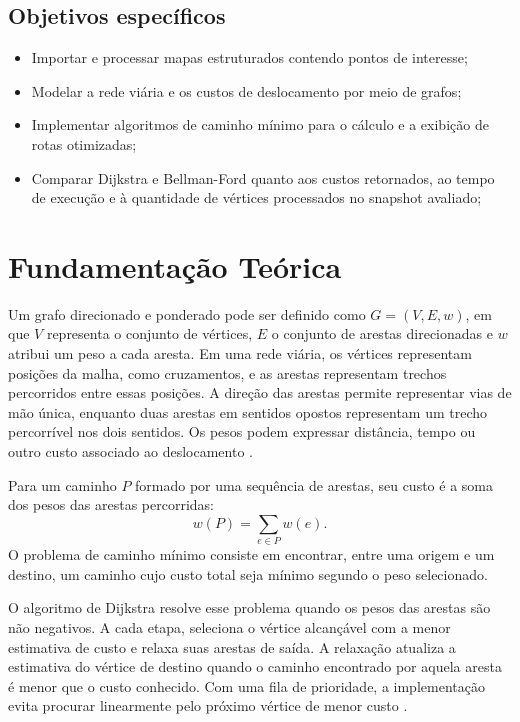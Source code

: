 \documentclass[12pt]{article}
\begin{document}
\subsection{Objetivos específicos}
\begin{itemize}
    \item Importar e processar mapas estruturados contendo pontos de interesse;
    \item Modelar a rede viária e os custos de deslocamento por meio de grafos;
    \item Implementar algoritmos de caminho mínimo para o cálculo e a exibição de rotas otimizadas;
    \item Comparar Dijkstra e Bellman-Ford quanto aos custos retornados, ao tempo de execução e à quantidade de vértices processados no snapshot avaliado;
\end{itemize}

\section{Fundamentação Teórica}
\label{sec:fundamentacao}

Um grafo direcionado e ponderado pode ser definido como
$G=(V,E,w)$, em que $V$ representa o conjunto de vértices, $E$ o
conjunto de arestas direcionadas e $w$ atribui um peso a cada aresta.
Em uma rede viária, os vértices representam posições da malha, como
cruzamentos, e as arestas representam trechos percorridos entre essas
posições. A direção das arestas permite representar vias de mão única,
enquanto duas arestas em sentidos opostos representam um trecho
percorrível nos dois sentidos. Os pesos podem expressar distância,
tempo ou outro custo associado ao deslocamento \cite{cormen2009}.

Para um caminho $P$ formado por uma sequência de arestas, seu custo é
a soma dos pesos das arestas percorridas:
\[
    w(P)=\sum_{e \in P} w(e).
\]
O problema de caminho mínimo consiste em encontrar, entre uma origem e
um destino, um caminho cujo custo total seja mínimo segundo o peso
selecionado.

O algoritmo de Dijkstra resolve esse problema quando os pesos das
arestas são não negativos. A cada etapa, seleciona o vértice alcançável
com a menor estimativa de custo e relaxa suas arestas de saída. A
relaxação atualiza a estimativa do vértice de destino quando o caminho
encontrado por aquela aresta é menor que o custo conhecido. Com uma
fila de prioridade, a implementação evita procurar linearmente pelo
próximo vértice de menor custo \cite{cormen2009}.
\end{document}
